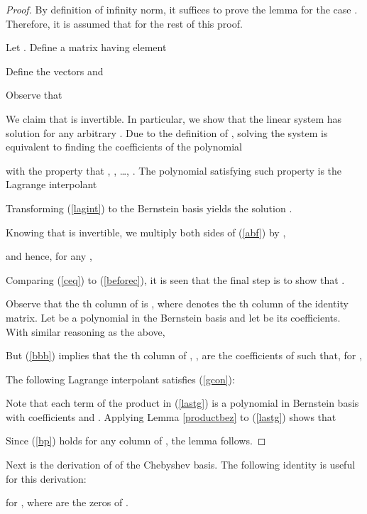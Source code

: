 \documentclass[12pt]{article}
\begin{document}
\begin{proof}
By definition of infinity norm, it suffices to prove the lemma for
the case .  Therefore, it is assumed that
 for the rest of this proof.

Let  . Define a matrix  having element

Define the vectors  and

Observe that

We claim that  is invertible. In particular, we show that the
linear system  has solution for any arbitrary . Due to the definition of , solving
the system  is equivalent to finding the coefficients
of the polynomial

with the property that , ,
\ldots, .  The polynomial  satisfying such
property is the Lagrange interpolant

Transforming (\ref{lagint}) to the Bernstein basis
yields the solution .

Knowing that  is invertible, we multiply both sides of
(\ref{abf}) by ,

and hence, for any ,

Comparing (\ref{ceq}) to (\ref{beforec}), it is seen that the
final step is to show that .

Observe that the th column of  is , where
 denotes the th column of the identity matrix. Let
 be a polynomial in the Bernstein basis and let  be its coefficients. With
similar reasoning as the above,

But (\ref{bbb}) implies that the th column of ,
, are the coefficients of  such that, for
,

The following Lagrange interpolant 
satisfies (\ref{gcon}):

Note that each term of the product in (\ref{lastg}) is a polynomial in
Bernstein basis with coefficients   and .
Applying Lemma \ref{productbez} to (\ref{lastg}) shows
that

Since (\ref{bp}) holds for any column  of ,
the lemma follows.
\end{proof}

Next is the derivation of  of the Chebyshev basis.  The following
identity is useful for this derivation:

for , where   are the  zeros of .
\end{document}
